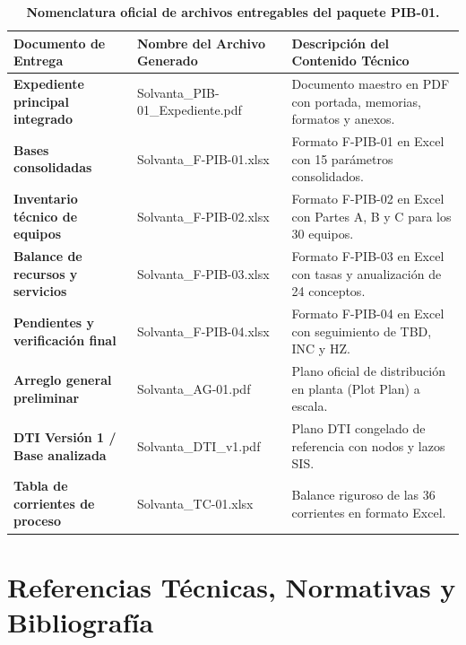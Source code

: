 \documentclass[10pt,letterpaper]{article}
\begin{document}
\begin{table}[H]
\centering\small
\setlength{\tabcolsep}{6pt}
\renewcommand{\arraystretch}{1.2}
\caption{\textbf{Nomenclatura oficial de archivos entregables del paquete PIB-01.}} \label{tab:nomenclatura_archivos}
\begin{tabularx}{\textwidth}{>{\bfseries}p{5.0cm} >{\ttfamily}p{6.0cm} X}
\toprule
\rowcolor{tableheader}
\color{white}\textbf{Documento de Entrega} & \color{white}\textbf{Nombre del Archivo Generado} & \color{white}\textbf{Descripción del Contenido Técnico} \\
\midrule
Expediente principal integrado & Solvanta\_PIB-01\_Expediente.pdf & Documento maestro en PDF con portada, memorias, formatos y anexos. \\ \addlinespace[2pt]
Bases consolidadas & Solvanta\_F-PIB-01.xlsx & Formato F-PIB-01 en Excel con 15 parámetros consolidados. \\ \addlinespace[2pt]
Inventario técnico de equipos & Solvanta\_F-PIB-02.xlsx & Formato F-PIB-02 en Excel con Partes A, B y C para los 30 equipos. \\ \addlinespace[2pt]
Balance de recursos y servicios & Solvanta\_F-PIB-03.xlsx & Formato F-PIB-03 en Excel con tasas y anualización de 24 conceptos. \\ \addlinespace[2pt]
Pendientes y verificación final & Solvanta\_F-PIB-04.xlsx & Formato F-PIB-04 en Excel con seguimiento de TBD, INC y HZ. \\ \addlinespace[2pt]
Arreglo general preliminar & Solvanta\_AG-01.pdf & Plano oficial de distribución en planta (Plot Plan) a escala. \\ \addlinespace[2pt]
DTI Versión 1 / Base analizada & Solvanta\_DTI\_v1.pdf & Plano DTI congelado de referencia con nodos y lazos SIS. \\ \addlinespace[2pt]
Tabla de corrientes de proceso & Solvanta\_TC-01.xlsx & Balance riguroso de las 36 corrientes en formato Excel. \\
\bottomrule
\end{tabularx}
\end{table}

\newpage
\section{Referencias Técnicas, Normativas y Bibliografía}
\end{document}
